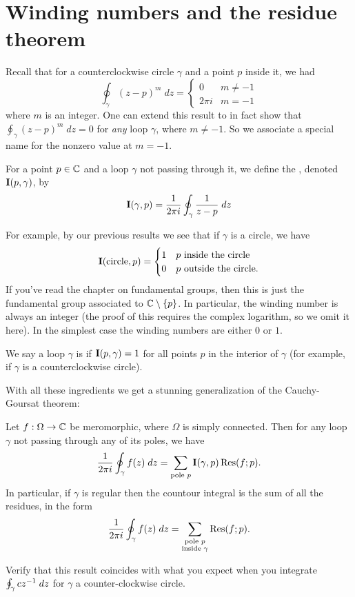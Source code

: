\section{Winding numbers and the residue theorem}
Recall that for a counterclockwise circle $\gamma$ and a point $p$ inside it, we had
\[
	\oint_{\gamma} (z-p)^m \; dz =
	\begin{cases}
		0 & m \neq -1 \\
		2\pi i & m = -1
	\end{cases}
\]
where $m$ is an integer.
One can extend this result to in fact show that $\oint_\gamma (z-p)^m \; dz = 0$
for \emph{any} loop $\gamma$, where $m \neq -1$.
So we associate a special name for the nonzero value at $m=-1$.
\begin{definition}
	For a point $p \in \mathbb C$ and a loop $\gamma$ not passing through it,
	we define the , denoted $\operatorname{\mathbf I}(p, \gamma)$, by
	\[
		\operatorname{\mathbf I}(\gamma, p) = \frac{1}{2\pi i} \oint_{\gamma} \frac{1}{z-p} \; dz
	\]
\end{definition}
For example, by our previous results we see that if $\gamma$ is a circle, we have
\[
	\operatorname{\mathbf I}(\text{circle}, p)
	=
	\begin{cases}
		1 & \text{$p$ inside the circle} \\
		0 & \text{$p$ outside the circle}.
	\end{cases}
\]
If you've read the chapter on fundamental groups, then this is just the fundamental group
associated to $\mathbb C \setminus \{p\}$.
In particular, the winding number is always an integer (the proof of this requires the complex logarithm,
so we omit it here).
In the simplest case the winding numbers are either $0$ or $1$.
\begin{definition}
	We say a loop $\gamma$ is  if $\operatorname{\mathbf I}(p, \gamma) = 1$
	for all points $p$ in the interior of $\gamma$ (for example,
	if $\gamma$ is a counterclockwise circle).
\end{definition}

With all these ingredients we get a stunning generalization of the Cauchy-Goursat theorem:
\begin{theorem}
	Let $f : \Omega \to \mathbb C$ be meromorphic, where $\Omega$ is simply connected.
	Then for any loop $\gamma$ not passing through any of its poles, we have
	\[
		\frac{1}{2\pi i} \oint_{\gamma} f(z) \; dz
		= \sum_{\text{pole $p$}} \operatorname{\mathbf I}(\gamma, p) \operatorname{Res}(f; p).
	\]
	In particular, if $\gamma$ is regular then the countour integral is the sum of all the residues, in the form
	\[
		\frac{1}{2\pi i} \oint_{\gamma} f(z) \; dz
		= \sum_{\substack{\text{pole $p$} \\ \text{inside $\gamma$}}}  \operatorname{Res}(f; p).
	\]
\end{theorem}
\begin{ques}
	Verify that this result coincides
	with what you expect when you integrate $\oint_\gamma cz^{-1} \; dz$
	for $\gamma$ a counter-clockwise circle.
\end{ques}

